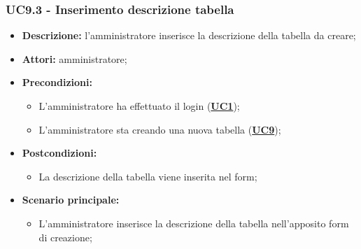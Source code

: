 \subsubsection{UC9.3 - Inserimento descrizione tabella}
\label{sec:UC9.3}
\begin{itemize}
	\item \textbf{Descrizione:} l’amministratore inserisce la descrizione della tabella da creare;
	\item \textbf{Attori:} amministratore;
	\item \textbf{Precondizioni:} 
	\begin{itemize}
		\item L’amministratore ha effettuato il login (\hyperref[sec:UC1]{\textbf{UC1}});
		\item L’amministratore sta creando una nuova tabella (\hyperref[sec:UC9]{\textbf{UC9}});
	\end{itemize}
	\item \textbf{Postcondizioni:} 
	\begin{itemize}
		\item La descrizione della tabella viene inserita nel form;
	\end{itemize}
	\item \textbf{Scenario principale:} 
	\begin{itemize}
		\item L’amministratore inserisce la descrizione della tabella nell'apposito form di creazione;
	\end{itemize}
\end{itemize}

